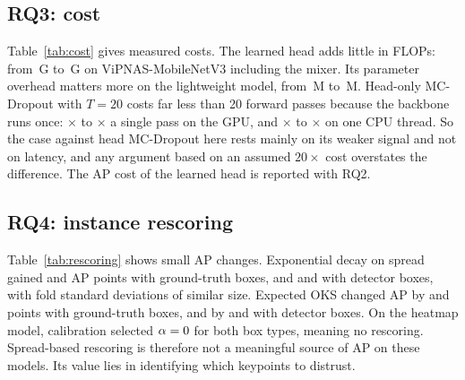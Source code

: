 \documentclass[preprint,11pt]{elsarticle}
\begin{document}
\begin{table}[t]
\centering\small
\caption{Seeds 0, 1 and 2 of the control and the full head on ViPNAS-MobileNetV3, mean $\pm$ SD across
seeds. AP is on val-test with ground-truth boxes. $\Delta$ is each seed's mean paired fold difference
from the control of the same seed, in AP points, then averaged across seeds. $\sigma$ and OKS are the
learned head's outputs. AUROC values are on val-test.}
\label{tab:seeds}
\end{table}

\subsection{RQ3: cost}

Table~\ref{tab:cost} gives measured costs. The learned head adds little in FLOPs: from
\FlopsMbvThreePlain{}\,G to \FlopsMbvThreeFull{}\,G on ViPNAS-MobileNetV3 including the mixer. Its
parameter overhead matters more on the lightweight model, from \ParamsMbvThreePlain{}\,M to
\ParamsMbvThreeFull{}\,M. Head-only MC-Dropout with $T{=}20$ costs far less than 20 forward passes
because the backbone runs once: \GpuRatioMbvThreeHetOks{}$\times$ to \GpuRatioHmRFiveZero{}$\times$ a single
pass on the GPU, and \CpuRatioMbvThreeHetOks{}$\times$ to \CpuRatioHmRFiveZero{}$\times$ on one CPU thread.
So the case against head MC-Dropout here rests mainly on its weaker signal and not on latency, and
any argument based on an assumed $20\times$ cost overstates the difference. The AP cost of the
learned head is reported with RQ2.

\begin{table}[t]
\centering\scriptsize
\caption{Model cost at batch size 1, median over 300 runs. ``Ratio'' is $T{=}20$ time over single-pass
time on the GPU. $^\ddagger$Includes the unused uncertainty modules of our head.
Sub-10\,ms GPU differences should be read with caution, since desktop applications shared the GPU.}
\label{tab:cost}
\end{table}

\subsection{RQ4: instance rescoring}

Table~\ref{tab:rescoring} shows small AP changes. Exponential decay on spread gained
\DapZsSimccMbvThreeExpAlphaDist{} and \DapZsSimccRFiveZeroExpAlphaDist{} AP points with ground-truth
boxes, and \DapZsSimccMbvThreeDetExpAlphaDist{} and \DapZsSimccRFiveZeroDetExpAlphaDist{} with detector
boxes, with fold standard deviations of similar size. Expected OKS changed AP by
\DapZsSimccMbvThreeEoksDist{} and \DapZsSimccRFiveZeroEoksDist{} points with ground-truth boxes, and
by \DapZsSimccMbvThreeDetEoksDist{} and \DapZsSimccRFiveZeroDetEoksDist{} with detector boxes. On the
heatmap model, calibration selected $\alpha=0$ for both box types, meaning no
rescoring. Spread-based rescoring is therefore not a
meaningful source of AP on these models. Its value lies in identifying which keypoints to distrust.
\end{document}
